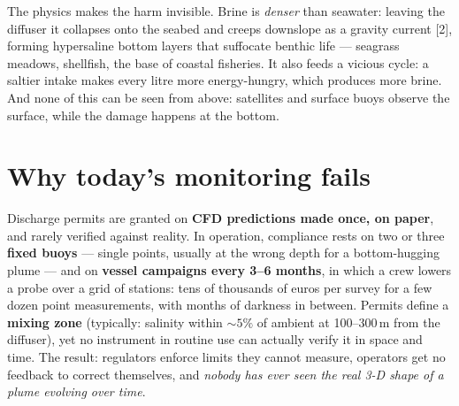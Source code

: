 \documentclass[10pt,a4paper]{article}
\newcommand{\keyword}[1]{\textbf{\color{deepblue}#1}}
\begin{document}
The physics makes the harm invisible. Brine is \emph{denser} than seawater: leaving the diffuser it collapses onto the seabed and creeps downslope as a gravity current [2], forming hypersaline bottom layers that suffocate benthic life --- seagrass meadows, shellfish, the base of coastal fisheries. It also feeds a vicious cycle: a saltier intake makes every litre more energy-hungry, which produces more brine. And none of this can be seen from above: satellites and surface buoys observe the surface, while the damage happens at the bottom.

\section{Why today's monitoring fails}
Discharge permits are granted on \keyword{CFD predictions made once, on paper}, and rarely verified against reality. In operation, compliance rests on two or three \keyword{fixed buoys} --- single points, usually at the wrong depth for a bottom-hugging plume --- and on \keyword{vessel campaigns every 3--6 months}, in which a crew lowers a probe over a grid of stations: tens of thousands of euros per survey for a few dozen point measurements, with months of darkness in between. Permits define a \keyword{mixing zone} (typically: salinity within ${\sim}5\%$ of ambient at 100--300\,m from the diffuser), yet no instrument in routine use can actually verify it in space and time. The result: regulators enforce limits they cannot measure, operators get no feedback to correct themselves, and \emph{nobody has ever seen the real 3-D shape of a plume evolving over time}.
\end{document}
